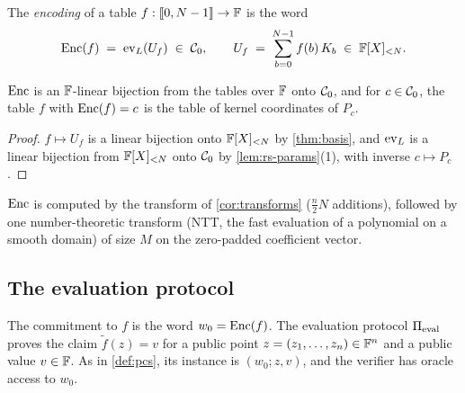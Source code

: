 \begin{definition}[Encoding]\label{def:encoding}
The \emph{encoding} of a table $f : \llbracket 0, N-1 \rrbracket \to \mathbb{F}$ is the word
\[
  \mathrm{Enc}(f) \;=\; \mathrm{ev}_L(U_f) \;\in\; \mathcal{C}_0,
  \qquad
  U_f \;=\; \sum_{b=0}^{N-1} f(b)\, K_b \;\in\; \mathbb{F}[X]_{<N} .
\]
\end{definition}

\begin{lemma}[Encoding]\label{lem:encoding}
$\mathrm{Enc}$ is an $\mathbb{F}$-linear bijection from the tables over $\mathbb{F}$ onto $\mathcal{C}_0$, and for $c \in \mathcal{C}_0$, the table $f$ with $\mathrm{Enc}(f) = c$ is the table of kernel coordinates of $P_c$.
\end{lemma}

\begin{proof}
$f \mapsto U_f$ is a linear bijection onto $\mathbb{F}[X]_{<N}$ by \cref{thm:basis}, and $\mathrm{ev}_L$ is a linear bijection from $\mathbb{F}[X]_{<N}$ onto $\mathcal{C}_0$ by \cref{lem:rs-params}(1), with inverse $c \mapsto P_c$.
\end{proof}

$\mathrm{Enc}$ is computed by the transform of \cref{cor:transforms} ($\tfrac{n}{2}N$ additions), followed by one number-theoretic transform (NTT, the fast evaluation of a polynomial on a smooth domain) of size $M$ on the zero-padded coefficient vector.

\subsection{The evaluation protocol}\label{sec:pcs:protocol}

The commitment to $f$ is the word $w_0 = \mathrm{Enc}(f)$.
The evaluation protocol $\Pi_{\mathrm{eval}}$ proves the claim $\tilde f(z) = v$ for a public point $z = (z_1,\dots,z_n) \in \mathbb{F}^n$ and a public value $v \in \mathbb{F}$.
As in \cref{def:pcs}, its instance is $(w_0; z, v)$, and the verifier has oracle access to $w_0$.

